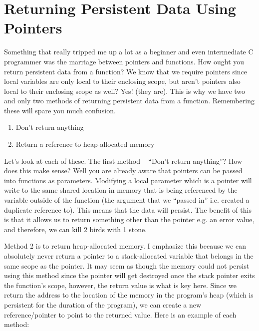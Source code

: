 \documentclass{article}
\begin{document}
\section{Returning Persistent Data Using Pointers}

Something that really tripped me up a lot as a beginner and even intermediate C programmer was the marriage
between pointers and functions. How ought you return persistent data from a function? We know that we require
pointers since local variables are only local to their enclosing scope, but aren’t pointers also local to
their enclosing scope as well? Yes! (they are). This is why we have two and only two methods of returning
persistent data from a function. Remembering these will spare you much confusion.

\begin{enumerate}

\item{Don’t return anything}

\item{Return a reference to heap-allocated memory}

\end{enumerate}

Let’s look at each of these. The first method – “Don’t return anything”? How does this make sense? Well you
are already aware that pointers can be passed into functions as parameters. Modifying a local parameter which
is a pointer will write to the same shared location in memory that is being referenced by the variable outside
of the function (the argument that we “passed in” i.e. created a duplicate reference to). This means that the
data will persist. The benefit of this is that it allows us to return something other than the pointer e.g.
an error value, and therefore, we can kill 2 birds with 1 stone.

Method 2 is to return heap-allocated memory. I emphasize this because we can absolutely never return a
pointer to a stack-allocated variable that belongs in the same scope as the pointer. It may seem as though
the memory could not persist using this method since the pointer will get destroyed once the stack pointer
exits the function’s scope, however, the return value is what is key here. Since we return the address to the
location of the memory in the program’s heap (which is persistent for the duration of the program), we can
create a new reference/pointer to point to the returned value. Here is an example of each method:
\end{document}
